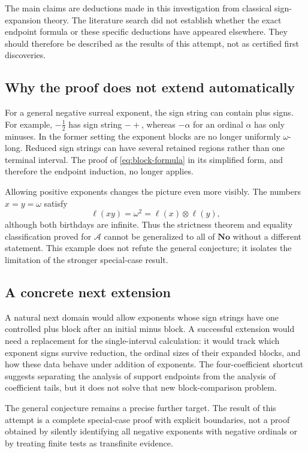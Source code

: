 \documentclass[11pt,letterpaper]{article}
\theoremstyle{definition}
\theoremstyle{remark}
\newcommand{\No}{\mathbf{No}}
\newcommand{\A}{\mathscr{A}}
\newcommand{\bd}{\ell}
\newcommand{\np}{\mathbin{\otimes}}
\begin{document}
The main claims are deductions made in this investigation from classical
sign-expansion theory. The literature search did not establish whether
the exact endpoint formula or these specific deductions have appeared
elsewhere. They should therefore be described as the results of this
attempt, not as certified first discoveries.

\subsection{Why the proof does not extend automatically}
For a general negative surreal exponent, the sign string can contain plus
signs. For example, \(-\tfrac12\) has sign string \(-+\), whereas
\(-\alpha\) for an ordinal \(\alpha\) has only minuses. In the former
setting the exponent blocks are no longer uniformly \(\omega\)-long.
Reduced sign strings can have several retained regions rather than one
terminal interval. The proof of \eqref{eq:block-formula} in its simplified
form, and therefore the endpoint induction, no longer applies.

Allowing positive exponents changes the picture even more visibly.
The numbers \(x=y=\omega\) satisfy
\[
 \bd(xy)=\omega^2=\bd(x)\np\bd(y),
\]
although both birthdays are infinite. Thus the strictness theorem and
equality classification proved for \(\A\) cannot be generalized to all
of \(\No\) without a different statement. This example does not refute
the general conjecture; it isolates the limitation of the stronger
special-case result.

\subsection{A concrete next extension}
A natural next domain would allow exponents whose sign strings have one
controlled plus block after an initial minus block. A successful extension
would need a replacement for the single-interval calculation: it would
track which exponent signs survive reduction, the ordinal sizes of their
expanded blocks, and how these data behave under addition of exponents.
The four-coefficient shortcut suggests separating the analysis of support
endpoints from the analysis of coefficient tails, but it does not solve
that new block-comparison problem.

The general conjecture remains a precise further target. The result of
this attempt is a complete special-case proof with explicit boundaries,
not a proof obtained by silently identifying all negative exponents with
negative ordinals or by treating finite tests as transfinite evidence.
\end{document}
